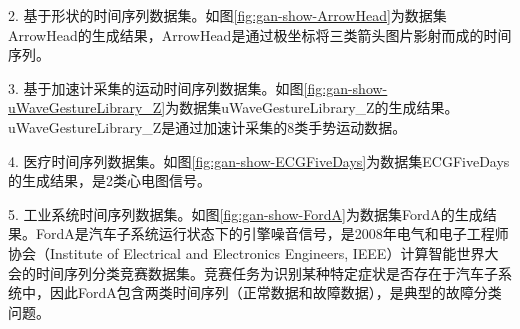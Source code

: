 2. 基于形状的时间序列数据集。如图\ref{fig:gan-show-ArrowHead}为数据集ArrowHead的生成结果，ArrowHead是通过极坐标将三类箭头图片影射而成的时间序列。

3. 基于加速计采集的运动时间序列数据集。如图\ref{fig:gan-show-uWaveGestureLibrary_Z}为数据集uWaveGestureLibrary\_Z的生成结果。uWaveGestureLibrary\_Z是通过加速计采集的8类手势运动数据。

4. 医疗时间序列数据集。如图\ref{fig:gan-show-ECGFiveDays}为数据集ECGFiveDays的生成结果，是2类心电图信号。

5. 工业系统时间序列数据集。如图\ref{fig:gan-show-FordA}为数据集FordA的生成结果。FordA是汽车子系统运行状态下的引擎噪音信号，是2008年电气和电子工程师协会（Institute of Electrical and Electronics Engineers, IEEE）计算智能世界大会的时间序列分类竞赛数据集。竞赛任务为识别某种特定症状是否存在于汽车子系统中，因此FordA包含两类时间序列（正常数据和故障数据），是典型的故障分类问题。

